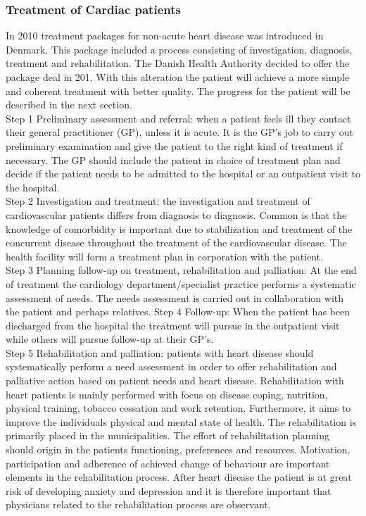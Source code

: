 \subsubsection{Treatment of Cardiac patients}

In 2010 treatment packages for non-acute heart disease was introduced in Denmark. This package included a process consisting of investigation, diagnosis, treatment and rehabilitation. The Danish Health Authority decided to offer the package deal in 201. With this alteration the patient will achieve a more simple and coherent treatment with better quality. 
The progress for the patient will be described in the next section. \\

Step 1 Preliminary assessment and referral: when a patient feels ill they contact their general practitioner (GP), unless it is acute. It is the GP's job to carry out preliminary examination and give the patient to the right kind of treatment if necessary. The GP should include the patient in choice of treatment plan and decide if the patient needs to be admitted to the hospital or an outpatient visit to the hospital.\\
Step 2 Investigation and treatment: the investigation and treatment of cardiovascular patients differs from diagnosis to diagnosis. Common is that the knowledge of comorbidity is important due to stabilization and treatment of the concurrent disease throughout the treatment of the cardiovascular disease. The health facility will form a treatment plan in corporation with the patient. \\
Step 3 Planning follow-up on treatment, rehabilitation and palliation: At the end of treatment the cardiology department/specialist practice performs a systematic assessment of needs. The needs assessment is carried out in collaboration with the patient and perhaps relatives. 
Step 4 Follow-up: When the patient has been discharged from the hospital the treatment will pursue in the outpatient visit while others will pursue follow-up at their GP's. \\
Step 5 Rehabilitation and palliation: patients with heart disease should systematically perform a need assessment in order to offer rehabilitation and palliative action based on patient needs and heart disease. Rehabilitation with heart patients is mainly performed with focus on disease coping, nutrition, physical training, tobacco cessation and work retention. Furthermore, it aims to improve the individuals physical and mental state of health. The rehabilitation is primarily placed in the municipalities. The effort of rehabilitation planning should origin in the patients functioning, preferences and resources. Motivation, participation and adherence of achieved change of behaviour are important elements in the rehabilitation process. After heart disease the patient is at great risk of developing anxiety and depression and it is therefore important that physicians related to the rehabilitation process are observant. 
